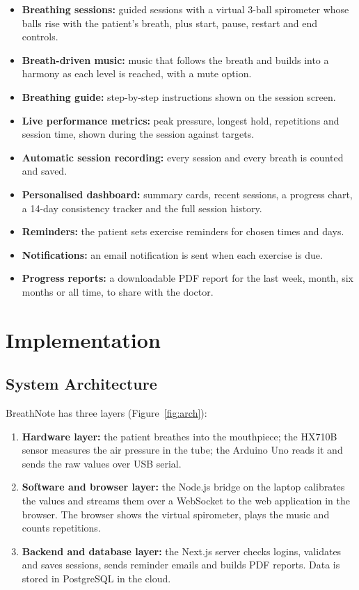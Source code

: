 \documentclass[12pt,a4paper]{article}
\begin{document}
\begin{itemize}
  \item \textbf{Breathing sessions:} guided sessions with a virtual 3-ball spirometer whose balls rise with the patient's breath, plus start, pause, restart and end controls.
  \item \textbf{Breath-driven music:} music that follows the breath and builds into a harmony as each level is reached, with a mute option.
  \item \textbf{Breathing guide:} step-by-step instructions shown on the session screen.
  \item \textbf{Live performance metrics:} peak pressure, longest hold, repetitions and session time, shown during the session against targets.
  \item \textbf{Automatic session recording:} every session and every breath is counted and saved.
  \item \textbf{Personalised dashboard:} summary cards, recent sessions, a progress chart, a 14-day consistency tracker and the full session history.
  \item \textbf{Reminders:} the patient sets exercise reminders for chosen times and days.
  \item \textbf{Notifications:} an email notification is sent when each exercise is due.
  \item \textbf{Progress reports:} a downloadable PDF report for the last week, month, six months or all time, to share with the doctor.
\end{itemize}

\section{Implementation}
\label{sec:impl}

\subsection{System Architecture}
\label{sec:arch}

BreathNote has three layers (Figure~\ref{fig:arch}):
\begin{enumerate}
  \item \textbf{Hardware layer:} the patient breathes into the mouthpiece; the HX710B sensor measures the air pressure in the tube; the Arduino Uno reads it and sends the raw values over USB serial.
  \item \textbf{Software and browser layer:} the Node.js bridge on the laptop calibrates the values and streams them over a WebSocket to the web application in the browser. The browser shows the virtual spirometer, plays the music and counts repetitions.
  \item \textbf{Backend and database layer:} the Next.js server checks logins, validates and saves sessions, sends reminder emails and builds PDF reports. Data is stored in PostgreSQL in the cloud.
\end{enumerate}
\end{document}
